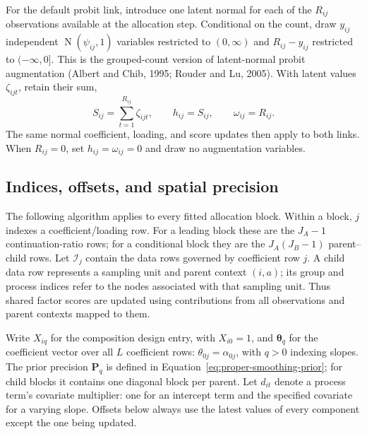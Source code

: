 \documentclass[11pt]{article}
\newcommand{\btheta}{\bm{\theta}}
\newcommand{\bP}{\bm{P}}
\newcommand{\Normal}{\operatorname{N}}
\begin{document}
For the default probit link, introduce one latent normal for each of the
\(R_{ij}\) observations available at the allocation step.
Conditional on the count, draw \(y_{ij}\) independent
\(\Normal(\psi_{ij},1)\) variables restricted to \((0,\infty)\) and
\(R_{ij}-y_{ij}\) restricted to \((-\infty,0]\). This is the grouped-count
version of latent-normal probit augmentation (Albert and Chib, 1995;
Rouder and Lu, 2005). With latent values \(\zeta_{ijt}\), retain their sum,
\begin{equation}
  S_{ij}=\sum_{t=1}^{R_{ij}}\zeta_{ijt},\qquad
  h_{ij}=S_{ij},\qquad \omega_{ij}=R_{ij}.
  \label{eq:probit-latent-sum}
\end{equation}
The same normal coefficient, loading, and score updates then apply to both
links. When \(R_{ij}=0\), set
\(h_{ij}=\omega_{ij}=0\) and draw no augmentation variables.

\subsection{Indices, offsets, and spatial precision}
\label{sec:sampler-notation}

The following algorithm applies to every fitted allocation block. Within a
block, \(j\) indexes a coefficient/loading row. For a leading block these
are the \(J_A-1\) continuation-ratio rows; for a conditional block they are
the \(J_A(J_B-1)\) parent--child rows. Let \(\mathcal I_j\) contain the
data rows governed by coefficient row \(j\). A child data row represents a
sampling unit and parent context \((i,a)\); its group and process indices
refer to the nodes associated with that sampling unit. Thus shared factor
scores are updated using contributions from all observations and parent
contexts mapped to them.

Write \(X_{iq}\) for the composition design entry, with \(X_{i0}=1\), and
\(\btheta_q\) for the coefficient vector over all \(L\) coefficient rows:
\(\theta_{0j}=\alpha_{0j}\), with \(q>0\) indexing slopes. The prior
precision \(\bP_q\) is defined in Equation~\ref{eq:proper-smoothing-prior};
for child blocks it contains one diagonal block per parent.
Let \(d_{it}\) denote a process term's covariate multiplier:
one for an intercept term and the specified covariate for a varying slope.
Offsets below always use the latest values of every component except the one
being updated.
\end{document}
